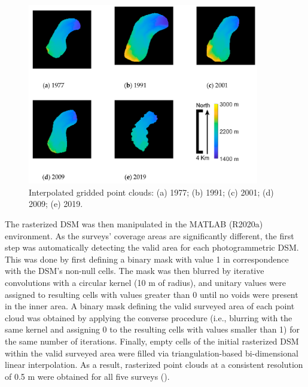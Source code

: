 \begin{figure}[ht]
    \centering
    \includegraphics[width=0.90\textwidth]{pcd_rasterized.png}
    \caption{Interpolated gridded point clouds: (a) 1977; (b) 1991; (c) 2001; (d) 2009; (e) 2019.}
    \label{fig:2:pcd_rasterzed}
\end{figure}

The rasterized DSM was then manipulated in the MATLAB (R2020a) environment.
As the surveys' coverage areas are significantly different, the first step was automatically detecting the valid area for each photogrammetric DSM. 
This was done by first defining a binary mask with value 1 in correspondence with the DSM's non-null cells. 
The mask was then blurred by iterative convolutions with a circular kernel (10 m of radius), and unitary values were assigned to resulting cells with values greater than 0 until no voids were present in the inner area.
A binary mask defining the valid surveyed area of each point cloud was obtained by applying the converse procedure (i.e., blurring with the same kernel and assigning 0 to the resulting cells with values smaller than 1) for the same number of iterations.
Finally, empty cells of the initial rasterized DSM within the valid surveyed area were filled via triangulation-based bi-dimensional linear interpolation.
As a result, rasterized point clouds at a consistent resolution of 0.5 m were obtained for all five surveys ().

